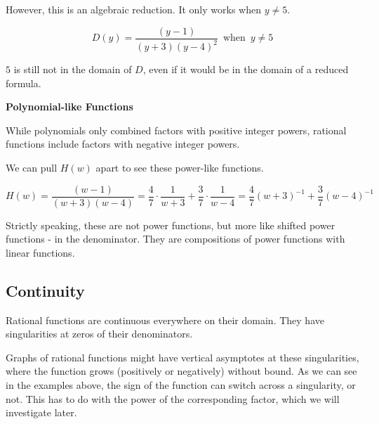 \documentclass{ximera}
\begin{document}
However, this is an algebraic reduction. It only works when $y \ne 5$.


\[
D(y) = \frac{(y-1)}{(y+3) (y-4)^2} \, \text{ when } \, y \ne 5
\]


$5$ is still not in the domain of $D$, even if it would be in the domain of a reduced formula.






\textbf{Polynomial-like Functions}


While polynomials only combined factors with positive integer powers, rational functions include factors with negative integer powers.


We can pull $H(w)$ apart to see these power-like functions.


\[    H(w) = \frac{(w-1)}{(w+3) (w-4)}  = \frac{4}{7} \cdot \frac{1}{w+3}  + \frac{3}{7} \cdot \frac{1}{w-4} =  \frac{4}{7} (w+3)^{-1}  + \frac{3}{7} (w-4)^{-1} \]


Strictly speaking, these are not power functions, but more like shifted power functions - in the denominator. They are compositions of power functions with linear functions.









\subsection*{Continuity}


Rational functions are continuous everywhere on their domain.  They have singularities at zeros of their denominators.  

Graphs of rational functions might have vertical asymptotes at these singularities, where the function grows (positively or negatively) without bound.  As we can see in the examples above, the sign of the function can switch across a singularity, or not.  This has to do with the power of the corresponding factor, which we will investigate later.
\end{document}
